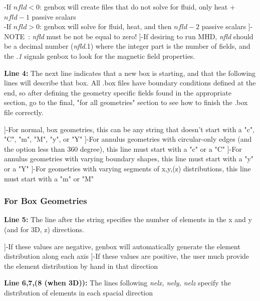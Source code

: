   \begin{description}-If $nfld<0$: genbox will create files that do not solve for fluid, only heat + $nfld-1$ passive scalars \\
      -If $nfld>0$: genbox will solve for fluid, heat, and then $nfld-2$ passive scalars 
    ]-NOTE~: \textit{nfld} must be not be equal to zero!
  ]-If desiring to run MHD, \textit{nfld} should be a decimal number (\textit{nfld}.1) where the integer part is the number of fields, and the \textit{.1} signals genbox to look for the magnetic field properties.
\end{description}
\par \textbf{Line 4:} The next line indicates that a new box is starting, and that the following lines will describe that box.  All .box files have boundary conditions defined at the end, so after defining the geometry specific fields found in the appropriate section, go to the final, "for all geometries" section to see how to finish the .box file correctly.

\begin{description}]-For normal, box geometries, this can be any string that doesn't start with a "c", "C", "m", "M", "y", or "Y"
  ]-For annulus geometries with circular-only edges (and the option less than 360 degree), this line must start with a "c" or a "C"
]-For annulus geometries with varying boundary shapes, this line must start with a "y" or a "Y"
]-For geometries with varying segments of x,y,(z) distributions, this line must start with a "m" or "M"
\end{description}




\subsubsection{ For Box Geometries}
\par \textbf{Line 5:} The line after the string specifies the number of elements in the x and y (and for 3D, z) directions.

\begin{description}]-If these values are negative, genbox will automatically generate the element distribution along each axis
  ]-If these values are positive, the user much provide the element distribution by hand in that direction
\end{description}
\par \textbf{Line 6,7,(8 (when 3D)):} The lines following \textit{nelx, nely, nelz} specify the distribution of elements in each spacial direction

